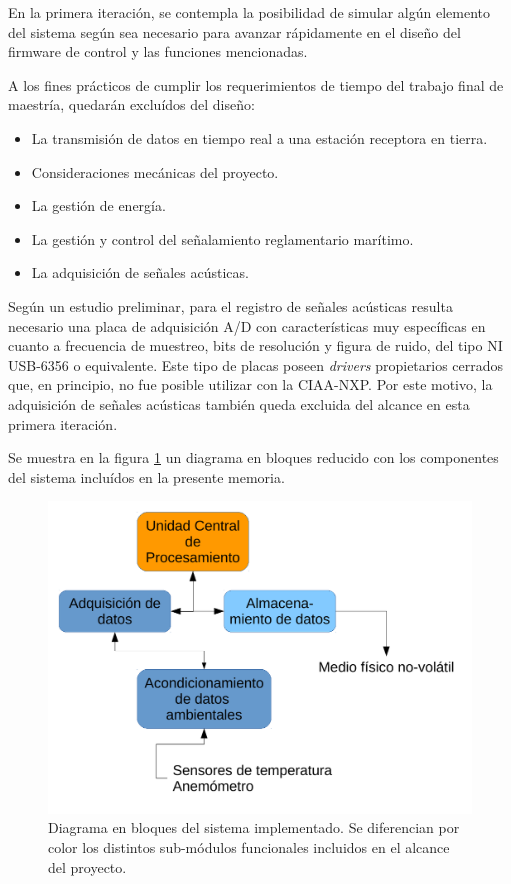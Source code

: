 En la primera iteración, se contempla la posibilidad de simular algún elemento del sistema según sea necesario para avanzar rápidamente en el diseño del firmware de control y las funciones mencionadas. 

A los fines prácticos de cumplir los requerimientos de tiempo del trabajo final de maestría, quedarán excluídos del diseño:

\begin{itemize}
	\item La transmisión de datos en tiempo real a una estación receptora en tierra.
	\item Consideraciones mecánicas del proyecto.
	\item La gestión de energía.
	\item La gestión y control del señalamiento reglamentario marítimo.
	\item La adquisición de señales acústicas.
\end{itemize}

Según un estudio preliminar, para el registro de señales acústicas resulta necesario una placa de adquisición A/D con características muy específicas en cuanto a frecuencia de muestreo, bits de resolución y figura de ruido, del tipo NI USB-6356 \cite{ni6356} o equivalente.  Este tipo de placas poseen \textit{drivers} propietarios cerrados que, en principio, no fue posible utilizar con la CIAA-NXP.   Por este motivo, la adquisición de señales acústicas también queda excluida del alcance en esta primera iteración.

Se muestra en la figura \ref{fig:diagramaBloquesReducido} un diagrama en bloques reducido con los componentes del sistema incluídos en la presente memoria.

\begin{figure}[ht]
  \centering
	\includegraphics[width=.75\textwidth]{./Figures/Diagrama_en_Bloques_reducido.pdf}
	\caption[Diagrama en bloques implementado]{Diagrama en bloques del sistema implementado. Se diferencian por color los distintos sub-módulos funcionales incluidos en el alcance del proyecto.}
	\label{fig:diagramaBloquesReducido}
\end{figure}





